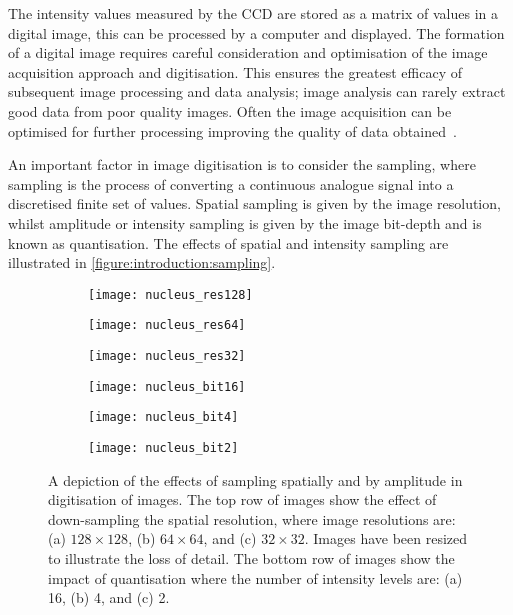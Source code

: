 The intensity values measured by the CCD are stored as a matrix of values in a digital image, this can be processed by a computer and displayed. The formation of a digital image requires careful consideration and optimisation of the image acquisition approach and digitisation. This ensures the greatest efficacy of subsequent image processing and data analysis; image analysis can rarely extract good data from poor quality images. Often the image acquisition can be optimised for further processing improving the quality of data obtained~\cite{Roeder2012}.

An important factor in image digitisation is to consider the sampling, where sampling is the process of converting a continuous analogue signal into a discretised finite set of values. Spatial sampling is given by the image resolution, whilst amplitude or intensity sampling is given by the image bit-depth and is known as quantisation. The effects of spatial and intensity sampling are illustrated in \autoref{figure:introduction:sampling}.

\begin{figure}[htbp!]\centering
	\begin{subfigure}[b]{0.32\linewidth}
		\centering
		\texttt{[image: nucleus\_res128]}
		\caption{}
		\label{figure:introduction:sampling:res128}
	\end{subfigure}
	\begin{subfigure}[b]{0.32\linewidth}
		\centering
		\texttt{[image: nucleus\_res64]}
		\caption{}
		\label{figure:introduction:sampling:res64}
	\end{subfigure}
	\begin{subfigure}[b]{0.32\linewidth}
		\centering
		\texttt{[image: nucleus\_res32]}
		\caption{}
		\label{figure:introduction:sampling:res32}
	\end{subfigure}
	\begin{subfigure}[b]{0.32\linewidth}
		\centering
		\texttt{[image: nucleus\_bit16]}
		\caption{}
		\label{figure:introduction:sampling:bit16}
	\end{subfigure}
	\begin{subfigure}[b]{0.32\linewidth}
		\centering
		\texttt{[image: nucleus\_bit4]}
		\caption{}
		\label{figure:introduction:sampling:bit4}
	\end{subfigure}
	\begin{subfigure}[b]{0.32\linewidth}
		\centering
		\texttt{[image: nucleus\_bit2]}
		\caption{}
		\label{figure:introduction:sampling:bit2}
	\end{subfigure}
\caption[Sampling in digitisation]{A depiction of the effects of sampling spatially and by amplitude in digitisation of images. The top row of images show the effect of down-sampling the spatial resolution, where image resolutions are: (a) $128 \times 128$, (b) $64 \times 64$, and (c) $32 \times 32$. Images have been resized to illustrate the loss of detail. The bottom row of images show the impact of quantisation where the number of intensity levels are: (a) 16, (b) 4, and (c) 2.}
\label{figure:introduction:sampling}
\end{figure}

